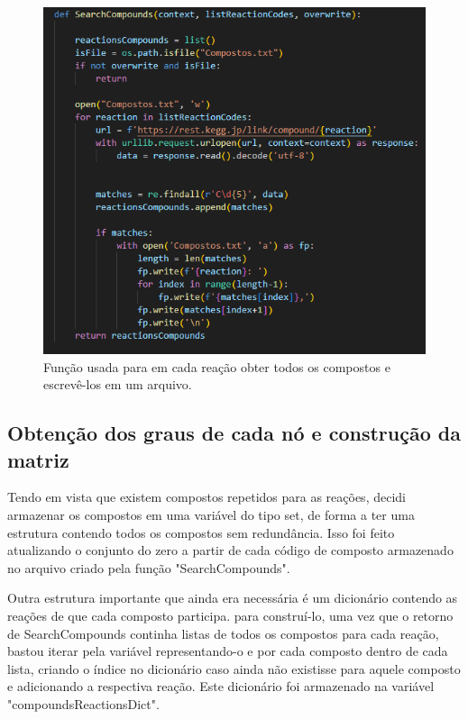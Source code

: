 \documentclass[brazilian,12pt,a4paper,final]{article}
\begin{document}
		
	\begin{figure}[hbtp]
		\begin{center}
			\includegraphics[]{SearchCompounds.png}
			\caption{Função usada para em cada reação obter todos os compostos e escrevê-los em um arquivo.}
			\label{fig}
		\end{center}
	\end{figure}
	
	\subsection{Obtenção dos graus de cada nó e construção da matriz}
	
	Tendo em vista que existem compostos repetidos para as reações, decidi armazenar os compostos em uma variável do tipo set, de forma a ter uma estrutura contendo todos os compostos sem redundância. Isso foi feito atualizando o conjunto do zero a partir de cada código de composto armazenado no arquivo criado pela função "SearchCompounds".
	\vspace{0.5cm}
	
	Outra estrutura importante que ainda era necessária é um dicionário contendo as reações de que cada composto participa. para construí-lo, uma vez que o retorno de SearchCompounds continha listas de todos os compostos para cada reação, bastou iterar pela variável representando-o e por cada composto dentro de cada lista, criando o índice no dicionário caso ainda não existisse para aquele composto e adicionando a respectiva reação. Este dicionário foi armazenado na variável "compoundsReactionsDict".
	\vspace{0.5cm}
	
\end{document}
